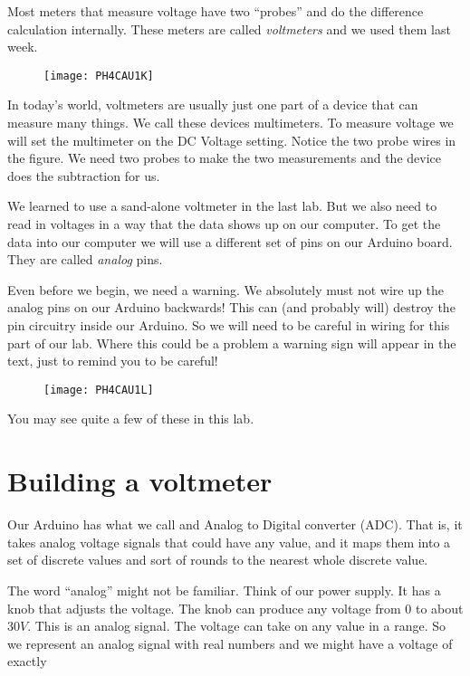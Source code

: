 Most meters that measure voltage have two ``probes'' and do the difference calculation internally. These meters are called \emph{voltmeters} and we used them last week.

\begin{figure}[h!]
	\centering
	\texttt{[image: PH4CAU1K]}
\end{figure}

In today's world, voltmeters are usually just one part of a device that can measure many things. We call these devices multimeters. To measure voltage we will set the multimeter on the DC Voltage setting. Notice the two probe wires in the figure. We need two probes to make the two measurements and the device does the subtraction for us.

We learned to use a sand-alone voltmeter in the last lab. But we also need to read in voltages in a way that the data shows up on our computer. To get the data into our computer we will use a different set of pins on our Arduino board. They are called \emph{analog} pins.

Even before we begin, we need a warning. We absolutely must not wire up the analog pins on our Arduino backwards! This can (and probably will) destroy the pin circuitry inside our Arduino. So we will need to be careful in wiring for this part of our lab. Where this could be a problem a warning sign will appear in the text, just to remind you to be careful! 

\begin{figure}[h!]
	\centering
	\texttt{[image: PH4CAU1L]}
\end{figure}

You may see quite a few of these in this lab.

\section{Building a voltmeter}

Our Arduino has what we call and Analog to Digital converter (ADC). That is, it takes analog voltage signals that could have any value, and it maps them into a set of discrete values and sort of rounds to the nearest whole discrete value.

The word ``analog'' might not be familiar. Think of our power supply. It has a knob that adjusts the voltage. The knob can produce any voltage from $0$ to about $30\unit{V}$. This is an analog signal. The voltage can take on any value in a range. So we represent an analog signal with real numbers and we might have a voltage of exactly 

